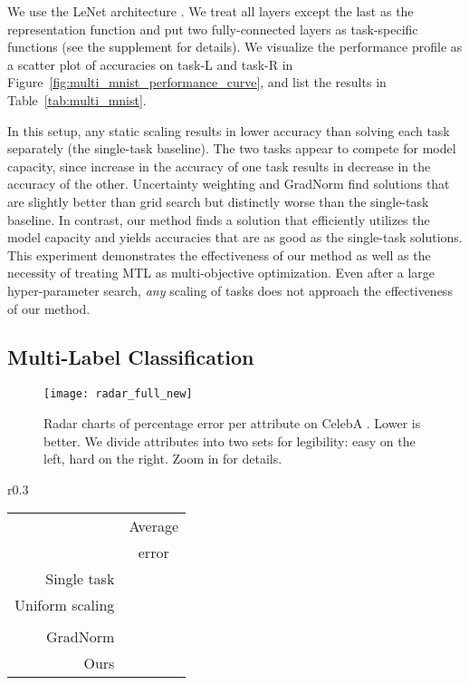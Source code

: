 \documentclass{article}
\begin{document}
We use the LeNet architecture \citep{mnist}. We treat all layers except the last as the representation function  and put two fully-connected layers as task-specific functions (see the supplement for details). We visualize the performance profile as a scatter plot of accuracies on task-L and task-R in Figure~\ref{fig:multi_mnist_performance_curve}, and list the results in Table~\ref{tab:multi_mnist}.

In this setup, any static scaling results in lower accuracy than solving each task separately (the single-task baseline). The two tasks appear to compete for model capacity, since increase in the accuracy of one task results in decrease in the accuracy of the other. Uncertainty weighting \citep{Kendall2018} and GradNorm \citep{Chen2018} find solutions that are slightly better than grid search but distinctly worse than the single-task baseline. In contrast, our method finds a solution that efficiently utilizes the model capacity and yields accuracies that are as good as the single-task solutions. This experiment demonstrates the effectiveness of our method as well as the necessity of treating MTL as multi-objective optimization. Even after a large hyper-parameter search, \emph{any} scaling of tasks does not approach the effectiveness of our method.



\subsection{Multi-Label Classification}

\begin{figure}[t]
\texttt{[image: radar\_full\_new]}
\vspace{1mm}
\caption{Radar charts of percentage error per attribute on CelebA \citep{celeba}. Lower is better. We divide attributes into two sets for legibility: easy on the left, hard on the right. Zoom in for details.}
\label{fig:multi_label_radar}
\end{figure}


\begin{wraptable}{r}{0.3\textwidth}
\begin{tabular}{r@{\hspace{2mm}}c@{}}
\toprule
& Average  \\
&  error \\
\midrule
Single task &  \\
Uniform scaling &  \\
\citealt{Kendall2018} &  \\
GradNorm &  \\
Ours &   \\
\bottomrule
\end{tabular}
\label{table:multi_label_bar}
\end{wraptable}
\end{document}
